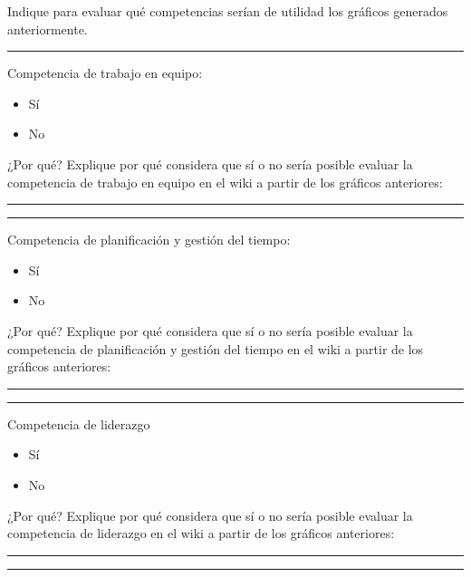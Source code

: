 \begin{mdframed}[style=cuestionarioST]
			Indique para evaluar qué competencias serían de utilidad los gráficos generados anteriormente.

			\rule{30mm}{1pt} \newline			

			Competencia de trabajo en equipo:
			\begin{itemize}
				\item Sí
				\item No
			\end{itemize}

			¿Por qué? \newline
			Explique por qué considera que sí o no sería posible evaluar la competencia de trabajo en equipo en el wiki a partir de los gráficos anteriores:\newline
			\rule{120mm}{1pt} \newline
			\rule{120mm}{1pt} \newline
			\bigskip

			Competencia de planificación y gestión del tiempo:
			\begin{itemize}
				\item Sí
				\item No
			\end{itemize}

			¿Por qué? \newline
			Explique por qué considera que sí o no sería posible evaluar la competencia de planificación y gestión del tiempo en el wiki a partir de los gráficos anteriores:\newline
			\rule{120mm}{1pt} \newline
			\rule{120mm}{1pt} \newline
			\bigskip

			Competencia de liderazgo
			\begin{itemize}
				\item Sí
				\item No
			\end{itemize}

			¿Por qué? \newline
			Explique por qué considera que sí o no sería posible evaluar la competencia de liderazgo en el wiki a partir de los gráficos anteriores:\newline
			\rule{120mm}{1pt} \newline
			\rule{120mm}{1pt} \newline
\end{mdframed}

